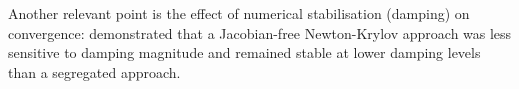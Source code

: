 \documentclass[sn-mathphys,Numbered]{sn-jnl}%
\begin{document}
Another relevant point is the effect of numerical stabilisation (damping) on convergence: \citet{Nishikawa2017} demonstrated that a Jacobian-free Newton-Krylov approach was less sensitive to damping magnitude and remained stable at lower damping levels than a segregated approach.
\end{document}
